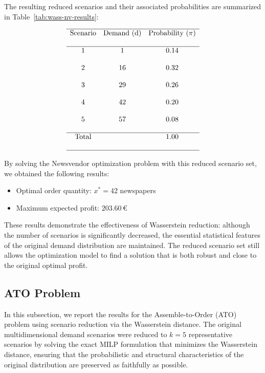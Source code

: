 \documentclass[a4paper,12pt]{article}
\begin{document}
	The resulting reduced scenarios and their associated probabilities are summarized in Table~\ref{tab:wass-nv-results}:
	
	\[
	\begin{array}{ccc}
		\hline
		\text{Scenario} & \text{Demand (d)} & \text{Probability (\(\pi\))} \\\\
		\hline
		1 & 1 & 0.14 \\\\
		2 & 16 & 0.32 \\\\
		3 & 29 & 0.26 \\\\
		4 & 42 & 0.20 \\\\
		5 & 57 & 0.08 \\\\
		\hline
		\text{Total} & & 1.00 \\\\
		\hline
	\end{array}
	\]
	\label{tab:wass-nv-results}
	
	By solving the Newsvendor optimization problem with this reduced scenario set, we obtained the following results:
	\begin{itemize}
		\item Optimal order quantity: $x^* = 42$ newspapers
		\item Maximum expected profit: $203.60$\,€
	\end{itemize}
	
	These results demonstrate the effectiveness of Wasserstein reduction: although the number of scenarios is significantly decreased, the essential statistical features of the original demand distribution are maintained. The reduced scenario set still allows the optimization model to find a solution that is both robust and close to the original optimal profit.
	\newpage
	\subsection{ATO Problem}
	
	In this subsection, we report the results for the Assemble-to-Order (ATO) problem using scenario reduction via the Wasserstein distance. The original multidimensional demand scenarios were reduced to $k=5$ representative scenarios by solving the exact MILP formulation that minimizes the Wasserstein distance, ensuring that the probabilistic and structural characteristics of the original distribution are preserved as faithfully as possible.
	
\end{document}
